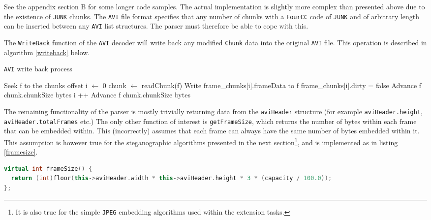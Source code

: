 \documentclass[paper=a4, fontsize=11pt,twoside]{scrartcl}
\numberwithin{table}{section}
\numberwithin{figure}{section}
\numberwithin{algorithm}{section}
\begin{document}
See the appendix section B for some longer code samples. The actual implementation is slightly more complex than presented above due to the existence of \texttt{JUNK} chunks. The \texttt{AVI} file format specifies that any number of chunks with a \texttt{FourCC} code of \texttt{JUNK} and of arbitrary length can be inserted between any \texttt{AVI} list structures. The parser must therefore be able to cope with this.

The \texttt{WriteBack} function of the \texttt{AVI} decoder will write back any modified \texttt{Chunk} data into the original \texttt{AVI} file. This operation is described in algorithm \ref{writeback} below.

\begin{algorithm}[!h]
\caption{\texttt{AVI} write back process}
\label{writeback}
\begin{algorithmic}[1]
\State Seek f to the chunks offset
\State i $\gets$ 0
	\State chunk $\gets$ readChunk(f)
			\State Write frame\_chunks[i].frameData to f
			\State frame\_chunks[i].dirty = false
		\Else
			\State Advance f chunk.chunkSize bytes
		\EndIf
		\State i ++
	\Else
		\State Advance f chunk.chunkSize bytes
	\EndIf
\EndWhile
\end{algorithmic}
\end{algorithm}

The remaining functionality of the parser is mostly trivially returning data from the \texttt{aviHeader} structure (for example \texttt{aviHeader.height}, \texttt{aviHeader.totalFrames} etc.) The only other function of interest is \texttt{getFrameSize}, which returns the number of bytes within each frame that can be embedded within. This (incorrectly) assumes that each frame can always have the same number of bytes embedded within it. This assumption is however true for the steganographic algorithms presented in the next section\footnote{It is also true for the simple \texttt{JPEG} embedding algorithms used within the extension tasks.}, and is implemented as in listing \ref{framesize}.

\begin{lstlisting}[language=C++, caption={\texttt{AVI} decoder \texttt{frameSize} function (\texttt{video/avi\_decoder.cc:298})}, frame=single, label=framesize]
virtual int frameSize() {
  return (int)floor(this->aviHeader.width * this->aviHeader.height * 3 * (capacity / 100.0));
};
\end{lstlisting}
\end{document}
